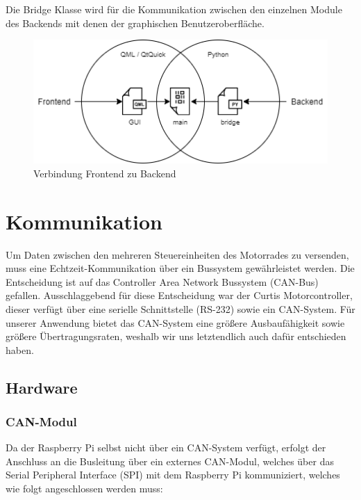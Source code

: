 Die Bridge Klasse wird für die Kommunikation zwischen den einzelnen Module des Backends mit denen der graphischen Benutzeroberfläche. 

\begin{figure}[H]
	\begin{center}
		\includegraphics[scale=1]{figures/hcis/bridge.png}
		\caption{Verbindung Frontend zu Backend}
	\end{center}
\end{figure}

\newpage


\section{Kommunikation}

Um Daten zwischen den mehreren Steuereinheiten des Motorrades zu versenden, muss eine Echtzeit-Kommunikation über ein Bussystem gewährleistet werden. Die Entscheidung ist auf das Controller Area Network Bussystem (CAN-Bus) gefallen. Ausschlaggebend für diese Entscheidung war der Curtis Motorcontroller, dieser verfügt über eine serielle Schnittstelle (RS-232) sowie ein CAN-System. Für unserer Anwendung bietet das CAN-System eine größere Ausbaufähigkeit sowie größere Übertragungsraten, weshalb wir uns letztendlich auch dafür entschieden haben.

\subsection{Hardware}

\subsubsection{CAN-Modul}

Da der Raspberry Pi selbst nicht über ein CAN-System verfügt, erfolgt der Anschluss an die Busleitung über ein externes CAN-Modul, welches über das Serial Peripheral Interface (SPI) mit dem Raspberry Pi kommuniziert, welches wie folgt angeschlossen werden muss: 

